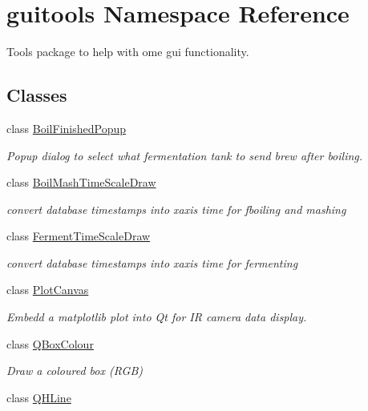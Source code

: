 \hypertarget{namespaceguitools}{}\section{guitools Namespace Reference}
\label{namespaceguitools}


Tools package to help with ome gui functionality.  


\subsection*{Classes}
\begin{DoxyCompactItemize}
\item 
class \mbox{\hyperlink{classguitools_1_1_boil_finished_popup}{Boil\+Finished\+Popup}}
\begin{DoxyCompactList}\small\item\em Popup dialog to select what fermentation tank to send brew after boiling. \end{DoxyCompactList}\item 
class \mbox{\hyperlink{classguitools_1_1_boil_mash_time_scale_draw}{Boil\+Mash\+Time\+Scale\+Draw}}
\begin{DoxyCompactList}\small\item\em convert database timestamps into xaxis time for fboiling and mashing \end{DoxyCompactList}\item 
class \mbox{\hyperlink{classguitools_1_1_ferment_time_scale_draw}{Ferment\+Time\+Scale\+Draw}}
\begin{DoxyCompactList}\small\item\em convert database timestamps into xaxis time for fermenting \end{DoxyCompactList}\item 
class \mbox{\hyperlink{classguitools_1_1_plot_canvas}{Plot\+Canvas}}
\begin{DoxyCompactList}\small\item\em Embedd a matplotlib plot into Qt for IR camera data display. \end{DoxyCompactList}\item 
class \mbox{\hyperlink{classguitools_1_1_q_box_colour}{Q\+Box\+Colour}}
\begin{DoxyCompactList}\small\item\em Draw a coloured box (R\+GB) \end{DoxyCompactList}\item 
class \mbox{\hyperlink{classguitools_1_1_q_h_line}{Q\+H\+Line}}

\end{DoxyCompactItemize}

